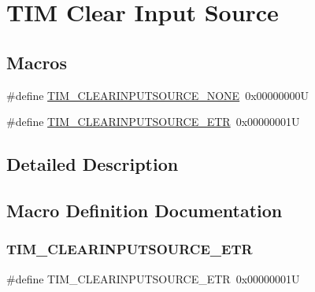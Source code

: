 \hypertarget{group___t_i_m___clear_input___source}{}\section{T\+IM Clear Input Source}
\label{group___t_i_m___clear_input___source}
\subsection*{Macros}
\begin{DoxyCompactItemize}
\item 
\#define \hyperlink{group___t_i_m___clear_input___source_ga48c5312aecd377fab00d62e9b4169e9e}{T\+I\+M\+\_\+\+C\+L\+E\+A\+R\+I\+N\+P\+U\+T\+S\+O\+U\+R\+C\+E\+\_\+\+N\+O\+NE}~0x00000000U
\item 
\#define \hyperlink{group___t_i_m___clear_input___source_gaa28a8cf1db85cf6c845c6c1f02ba5c8e}{T\+I\+M\+\_\+\+C\+L\+E\+A\+R\+I\+N\+P\+U\+T\+S\+O\+U\+R\+C\+E\+\_\+\+E\+TR}~0x00000001U
\end{DoxyCompactItemize}


\subsection{Detailed Description}


\subsection{Macro Definition Documentation}
\mbox{\label{group___t_i_m___clear_input___source_gaa28a8cf1db85cf6c845c6c1f02ba5c8e}} 
\subsubsection{\texorpdfstring{T\+I\+M\+\_\+\+C\+L\+E\+A\+R\+I\+N\+P\+U\+T\+S\+O\+U\+R\+C\+E\+\_\+\+E\+TR}{TIM\_CLEARINPUTSOURCE\_ETR}}
{\footnotesize\ttfamily \#define T\+I\+M\+\_\+\+C\+L\+E\+A\+R\+I\+N\+P\+U\+T\+S\+O\+U\+R\+C\+E\+\_\+\+E\+TR~0x00000001U}

